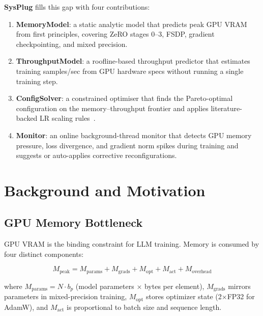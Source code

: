 \documentclass[10pt,twocolumn]{article}
\begin{document}
\textbf{SysPlug} fills this gap with four contributions:

\begin{enumerate}
  \item \textbf{MemoryModel}: a static analytic model that predicts peak GPU
    VRAM from first principles, covering ZeRO stages 0--3, FSDP, gradient
    checkpointing, and mixed precision.

  \item \textbf{ThroughputModel}: a roofline-based throughput predictor that
    estimates training samples/sec from GPU hardware specs without running a
    single training step.

  \item \textbf{ConfigSolver}: a constrained optimiser that finds the
    Pareto-optimal configuration on the memory--throughput frontier and applies
    literature-backed LR scaling rules~\cite{goyal2017accurate,krizhevsky2014one}.

  \item \textbf{Monitor}: an online background-thread monitor that detects
    GPU memory pressure, loss divergence, and gradient norm spikes during
    training and suggests or auto-applies corrective reconfigurations.
\end{enumerate}

\section{Background and Motivation}

\subsection{GPU Memory Bottleneck}

GPU VRAM is the binding constraint for LLM training.  Memory is consumed by
four distinct components:

\begin{equation}
M_\text{peak} = M_\text{params} + M_\text{grads} + M_\text{opt} + M_\text{act} + M_\text{overhead}
\label{eq:memory}
\end{equation}

where $M_\text{params} = N \cdot b_p$ (model parameters $\times$ bytes per
element), $M_\text{grads}$ mirrors parameters in mixed-precision training,
$M_\text{opt}$ stores optimizer state (2$\times$FP32 for AdamW), and
$M_\text{act}$ is proportional to batch size and sequence length.
\end{document}
